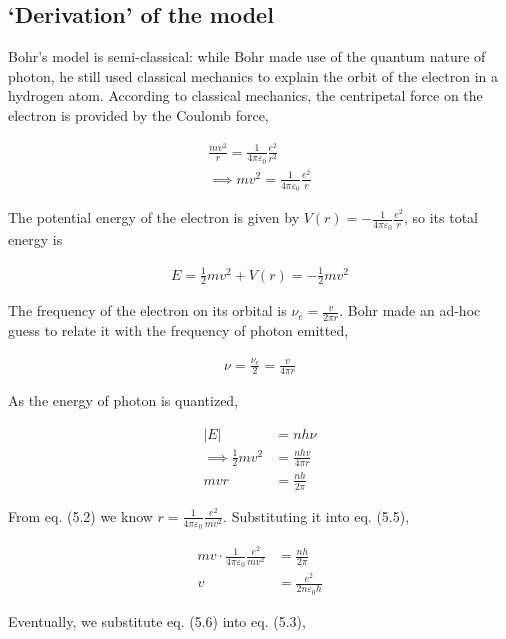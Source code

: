 \documentclass[12pt]{book} %
\numberwithin{equation}{chapter}
\def\e{\varepsilon}
\begin{document}
\subsection*{`Derivation' of the model}
Bohr's model is semi-classical: while Bohr made use of the quantum nature of photon, he still used classical mechanics to explain the orbit of the electron in a hydrogen atom.\bigskip\newline
According to classical mechanics, the centripetal force on the electron is provided by the Coulomb force,
\begin{eqnbox}
\begin{align}
\frac{mv^{2}}{r}=\frac{1}{4\pi\e_{0}}\frac{e^{2}}{r^{2}}\nonumber\\
\implies mv^{2}=\frac{1}{4\pi\e_{0}}\frac{e^{2}}{r}
\end{align}
\end{eqnbox}
The potential energy of the electron is given by $V(r)=-\frac{1}{4\pi\e_{0}}\frac{e^{2}}{r}$, so its total energy is
\begin{eqnbox}
\begin{align}
E=\frac{1}{2}mv^{2}+V(r)=-\frac{1}{2}mv^{2}
\end{align}
\end{eqnbox}
The frequency of the electron on its orbital is $\nu_{e}=\frac{v}{2\pi r}$. Bohr made an ad-hoc guess to relate it with the frequency of photon emitted,
\begin{eqnbox}
\begin{align}
\nu=\frac{\nu_{e}}{2}=\frac{v}{4\pi r}
\end{align}
\end{eqnbox}
As the energy of photon is quantized,
\begin{eqnbox}
\begin{align}
\left|E\right|&=nh\nu\nonumber\\
\implies \frac{1}{2}mv^{2}&=\frac{nhv}{4\pi r}\nonumber\\
mvr&=\frac{nh}{2\pi}
\end{align}
\end{eqnbox}
From eq. (5.2) we know $r=\frac{1}{4\pi\e_{0}}\frac{e^{2}}{mv^{2}}$. Substituting it into eq. (5.5),
\begin{eqnbox}
\begin{align}
mv\cdot\frac{1}{4\pi\e_{0}}\frac{e^{2}}{mv^{2}}&=\frac{nh}{2\pi}\nonumber\\
v&=\frac{e^{2}}{2n\e_{0}h}
\end{align}
\end{eqnbox}
Eventually, we substitute eq. (5.6) into eq. (5.3),
\end{document}

